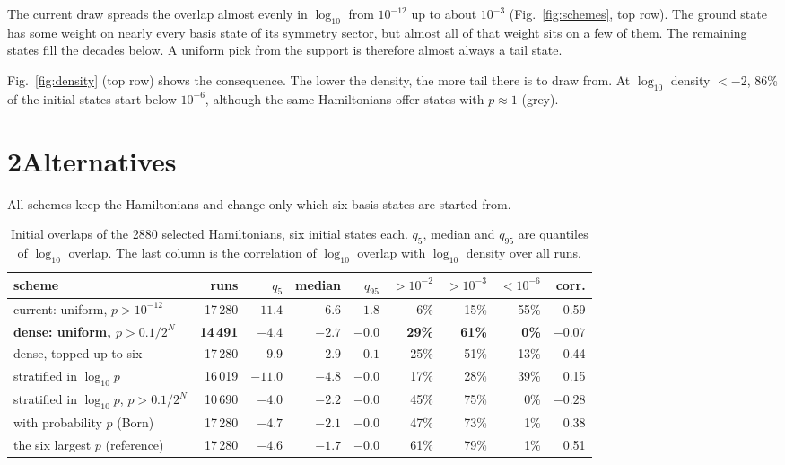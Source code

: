 \documentclass[10pt,a4paper]{article}
\begin{document}
The current draw spreads the overlap almost evenly in $\log_{10}$ from $10^{-12}$ up to about
$10^{-3}$ (Fig.~\ref{fig:schemes}, top row). The ground state has some weight on nearly every
basis state of its symmetry sector, but almost all of that weight sits on a few of them. The
remaining states fill the decades below. A uniform pick from the support is therefore almost
always a tail state.

Fig.~\ref{fig:density} (top row) shows the consequence. The lower the density, the more tail
there is to draw from. At $\log_{10}$ density $<-2$, 86\% of the initial states start below
$10^{-6}$, although the same Hamiltonians offer states with $p\approx1$ (grey).

\section*{2\quad Alternatives}
All schemes keep the Hamiltonians and change only which six basis states are started from.

\begin{table}[h]
\centering\footnotesize\setlength{\tabcolsep}{4.5pt}
\begin{tabular}{lrrrrrrrr}
\toprule
scheme & runs & $q_{5}$ & median & $q_{95}$ & $>10^{-2}$ & $>10^{-3}$ & $<10^{-6}$ & corr.\\
\midrule
current: uniform, $p>10^{-12}$ & 17\,280 & $-11.4$ & $-6.6$ & $-1.8$ & 6\% & 15\% & 55\% & 0.59\\
\textbf{dense: uniform, $p>0.1/2^N$} & \textbf{14\,491} & $\mathbf{-4.4}$ & $\mathbf{-2.7}$ & $\mathbf{-0.0}$ & \textbf{29\%} & \textbf{61\%} & \textbf{0\%} & $\mathbf{-0.07}$\\
dense, topped up to six & 17\,280 & $-9.9$ & $-2.9$ & $-0.1$ & 25\% & 51\% & 13\% & 0.44\\
stratified in $\log_{10}p$ & 16\,019 & $-11.0$ & $-4.8$ & $-0.0$ & 17\% & 28\% & 39\% & 0.15\\
stratified in $\log_{10}p$, $p>0.1/2^N$ & 10\,690 & $-4.0$ & $-2.2$ & $-0.0$ & 45\% & 75\% & 0\% & $-0.28$\\
with probability $p$ (Born) & 17\,280 & $-4.7$ & $-2.1$ & $-0.0$ & 47\% & 73\% & 1\% & 0.38\\
\midrule
the six largest $p$ (reference) & 17\,280 & $-4.6$ & $-1.7$ & $-0.0$ & 61\% & 79\% & 1\% & 0.51\\
\bottomrule
\end{tabular}
\caption{Initial overlaps of the 2880 selected Hamiltonians, six initial states each.
$q_5$, median and $q_{95}$ are quantiles of $\log_{10}$ overlap. The last column is the
correlation of $\log_{10}$ overlap with $\log_{10}$ density over all runs.}
\label{tab:schemes}
\end{table}
\end{document}
